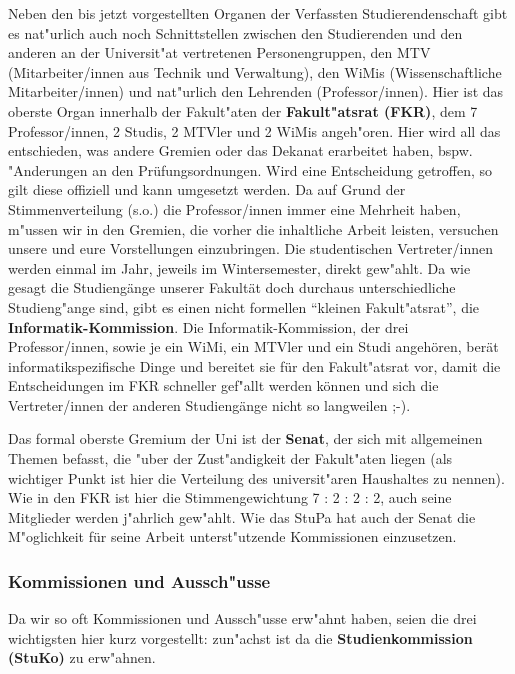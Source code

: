 Neben den bis jetzt vorgestellten Organen der Verfassten Studierendenschaft 
gibt es nat"urlich auch noch Schnittstellen zwischen den Studierenden und den anderen 
an der Universit"at vertretenen Personengruppen, den MTV (Mitarbeiter/innen 
aus Technik und Verwaltung), den WiMis (Wissenschaftliche Mitarbeiter/innen) und nat"urlich den Lehrenden (Professor/innen). Hier ist das 
oberste Organ innerhalb der Fakult"aten der \textbf{Fakult"atsrat (FKR)}, 
dem 7 Professor/innen, 2 Studis, 2 MTVler und 2 WiMis angeh"oren. Hier wird all das 
entschieden, was andere Gremien oder das Dekanat erarbeitet haben, bspw. 
"Anderungen an den Prüfungsordnungen. Wird eine Entscheidung getroffen, so gilt diese offiziell und kann umgesetzt werden. Da auf Grund der 
Stimmenverteilung (s.o.) die Professor/innen immer eine Mehrheit haben, m"ussen wir 
in den Gremien, die vorher die inhaltliche Arbeit leisten, versuchen unsere 
und eure Vorstellungen einzubringen. Die studentischen 
Vertreter/innen werden einmal im Jahr, jeweils im Wintersemester, direkt gew"ahlt. Da 
wie gesagt die Studiengänge unserer Fakultät doch durchaus unterschiedliche 
Studieng"ange sind, gibt es einen nicht formellen "`kleinen Fakult"atsrat"', 
die \textbf{Informatik-Kommission}. Die Informatik-Kommission, der drei Professor/innen, 
sowie je ein WiMi, ein MTVler und ein Studi angehören, berät informatikspezifische Dinge und 
bereitet sie für den Fakult"atsrat vor, damit die Entscheidungen im FKR 
schneller gef"allt werden können und sich die Vertreter/innen der anderen Studiengänge nicht so langweilen 
;-).

Das formal oberste Gremium der Uni ist der \textbf{Senat}, der sich mit 
allgemeinen Themen befasst, die "uber der Zust"andigkeit der Fakult"aten 
liegen (als wichtiger Punkt ist hier die Verteilung des universit"aren 
Haushaltes zu nennen). Wie in den FKR ist hier die Stimmengewichtung 7 : 2 : 2 
: 2, auch seine Mitglieder werden j"ahrlich gew"ahlt. Wie das StuPa hat auch der 
Senat die M"oglichkeit für seine Arbeit unterst"utzende Kommissionen einzusetzen.

\subsubsection*{Kommissionen und Aussch"usse}

Da wir so oft Kommissionen und Aussch"usse erw"ahnt haben, seien die drei 
wichtigsten hier kurz vorgestellt: zun"achst ist da die 
\textbf{Studienkommission (StuKo)} zu erw"ahnen.

